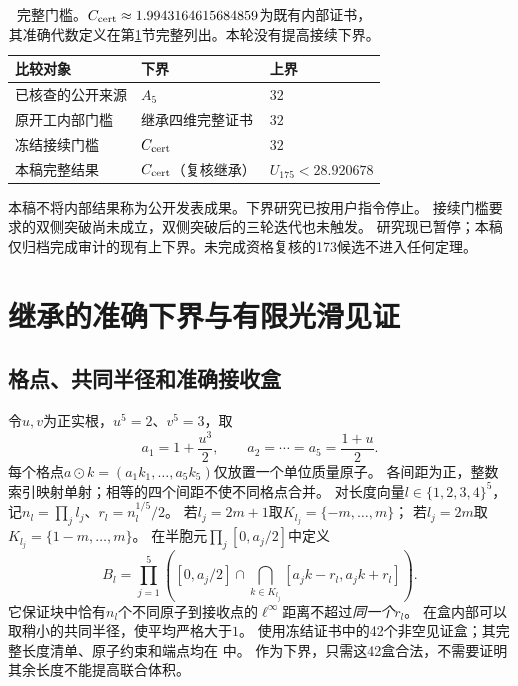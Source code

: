 \documentclass[UTF8,fontset=fandol,zihao=-4,a4paper]{ctexart}
\newcommand{\1}{\mathbf 1}
\begin{document}
\begin{table}[ht]
\centering\small
\begin{tabular}{p{}p{}p{}}
\toprule
比较对象&下界&上界\\ \midrule
已核查的公开来源&$A_5$&$32$\\
原开工内部门槛&继承四维完整证书&$32$\\
冻结接续门槛&$C_{\rm cert}$&$32$\\
本稿完整结果&$C_{\rm cert}$（复核继承）&$U_{175}<28.920678$\\
\bottomrule
\end{tabular}
\caption{完整门槛。$C_{\rm cert}\approx1.9943164615684859$为既有内部证书，
其准确代数定义在第\ref{sec:lower}节完整列出。本轮没有提高接续下界。}
\end{table}

本稿不将内部结果称为公开发表成果。下界研究已按用户指令停止。
接续门槛要求的双侧突破尚未成立，双侧突破后的三轮迭代也未触发。
研究现已暂停；本稿仅归档完成审计的现有上下界。未完成资格复核的173候选不进入任何定理。

\section{继承的准确下界与有限光滑见证}\label{sec:lower}
\subsection{格点、共同半径和准确接收盒}
令$u,v$为正实根，$u^5=2$、$v^5=3$，取
\[
 a_1=1+\frac{u^3}{2},\qquad a_2=\cdots=a_5=\frac{1+u}{2}.
\]
每个格点$a\odot k=(a_1k_1,\ldots,a_5k_5)$仅放置一个单位质量原子。
各间距为正，整数索引映射单射；相等的四个间距不使不同格点合并。
对长度向量$l\in\{1,2,3,4\}^5$，记$n_l=\prod_jl_j$、$r_l=n_l^{1/5}/2$。
若$l_j=2m+1$取$K_{l_j}=\{-m,\ldots,m\}$；
若$l_j=2m$取$K_{l_j}=\{1-m,\ldots,m\}$。
在半胞元$\prod_j[0,a_j/2]$中定义
\[
 B_l=\prod_{j=1}^5\left([0,a_j/2]\cap
           \bigcap_{k\in K_{l_j}}[a_jk-r_l,a_jk+r_l]\right).
\]
它保证块中恰有$n_l$个不同原子到接收点的$\ell^\infty$距离不超过\emph{同一个}$r_l$。
在盒内部可以取稍小的共同半径，使平均严格大于$1$。
使用冻结证书中的42个非空见证盒；其完整长度清单、原子约束和端点均在
中。
作为下界，只需这42盒合法，不需要证明其余长度不能提高联合体积。
\end{document}
